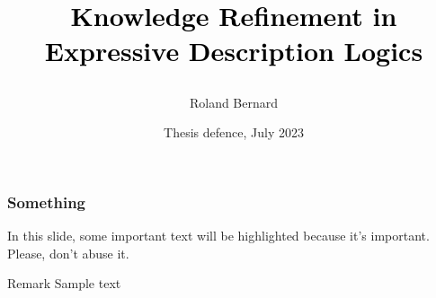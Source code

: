\documentclass{beamer}
\title{\raggedright\huge\bf\textcolor{black}{
  Knowledge Refinement in Expressive Description Logics}
}
\author{Roland Bernard}
\institute{
  Faculty of Engineering\\
  Free University of Bozen-Bolzano
}
\date{Thesis defence, July 2023}
\begin{document}
\frame{\titlepage}
\logo{}

\begin{frame}
\frametitle{Something}

In this slide, some important text will be
\alert{highlighted} because it's important.
Please, don't abuse it.

\begin{block}{Remark}
Sample text
\end{block}
\end{frame}
\end{document}
